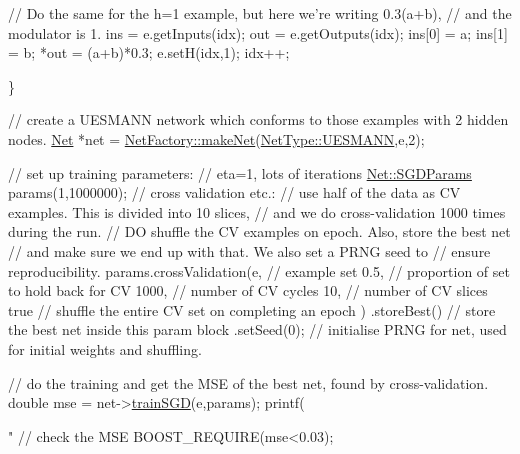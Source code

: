 \begin{DoxyCodeInclude}
        \textcolor{comment}{// Do the same for the h=1 example, but here we're writing 0.3(a+b),}
        \textcolor{comment}{// and the modulator is 1.}
        ins = e.getInputs(idx);
        out = e.getOutputs(idx);
        ins[0] = a;
        ins[1] = b;
        *out = (a+b)*0.3;
        e.setH(idx,1);
        idx++;
        
    \}
    
    \textcolor{comment}{// create a UESMANN network which conforms to those examples with 2 hidden nodes.}
    \hyperlink{classNet}{Net} *net = \hyperlink{classNetFactory_abee207e81a04a7abf08e1f50bc2fe000}{NetFactory::makeNet}(\hyperlink{netType_8hpp_a1526df0fc932ccf720aa26267f923213a9860f22cc29a7fcf38323883669eedcf}{NetType::UESMANN},e,2);
    
    \textcolor{comment}{// set up training parameters:}
    \textcolor{comment}{// eta=1, lots of iterations}
    \hyperlink{structNet_1_1SGDParams}{Net::SGDParams} params(1,1000000);
    \textcolor{comment}{// cross validation etc.:}
    \textcolor{comment}{// use half of the data as CV examples. This is divided into 10 slices,}
    \textcolor{comment}{// and we do cross-validation 1000 times during the run.}
    \textcolor{comment}{// DO shuffle the CV examples on epoch. Also, store the best net}
    \textcolor{comment}{// and make sure we end up with that. We also set a PRNG seed to}
    \textcolor{comment}{// ensure reproducibility.}
    params.crossValidation(e, \textcolor{comment}{// example set}
                           0.5, \textcolor{comment}{// proportion of set to hold back for CV}
                           1000, \textcolor{comment}{// number of CV cycles}
                           10, \textcolor{comment}{// number of CV slices}
                           \textcolor{keyword}{true} \textcolor{comment}{// shuffle the entire CV set on completing an epoch}
                           )
          .storeBest() \textcolor{comment}{// store the best net inside this param block}
          .setSeed(0); \textcolor{comment}{// initialise PRNG for net, used for initial weights and shuffling.}
    
    \textcolor{comment}{// do the training and get the MSE of the best net, found by cross-validation.}
    \textcolor{keywordtype}{double} mse = net->\hyperlink{classNet_a4e527a7773eed5fb071b78ef3a636c95}{trainSGD}(e,params);
    printf(\textcolor{stringliteral}{"%
    \textcolor{comment}{// check the MSE}
    BOOST\_REQUIRE(mse<0.03);
    
}
\end{DoxyCodeInclude}
